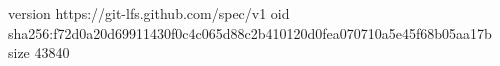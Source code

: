 version https://git-lfs.github.com/spec/v1
oid sha256:f72d0a20d69911430f0c4c065d88c2b410120d0fea070710a5e45f68b05aa17b
size 43840
